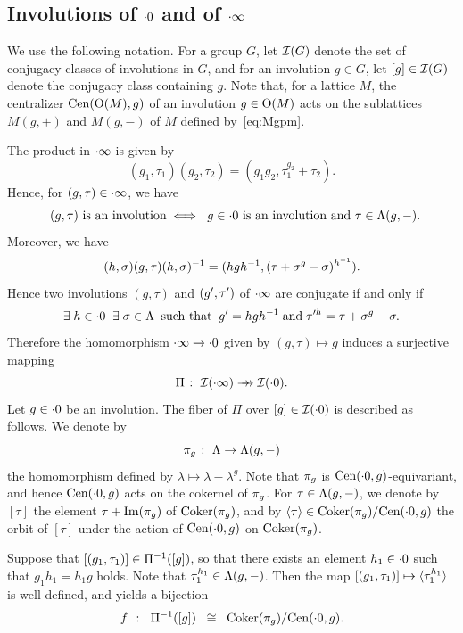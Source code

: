 \documentclass{amsart} %
\begin{document}
\subsection{Involutions of $\cdot 0$ and of $\cdot \infty$}\label{subsec:zinf}
%
We use the following notation.
For a group $G$, let $\mathord{\mathcal{I}}(G)$ denote the set of conjugacy classes of involutions in $G$, and 
for an involution $g\in G$, let $[g]\in \mathord{\mathcal{I}}(G)$ denote the conjugacy class containing $g$.
Note that, for a lattice $M$, 
 the centralizer $\mathrm{Cen}(\mathord{\mathrm{O}}(M), g)$ 
 of an involution $g\in \mathord{\mathrm{O}}(M)$
acts on 
the sublattices $M(g, +)$ and $M(g, -)$ of $M$ defined by~\eqref{eq:Mgpm}.
\par
The product in $\cdot \infty$ is given by 
\[
(g_1, \tau_1)(g_2, \tau_2)=(g_1g_2, \tau_1^{g_2}+\tau_2).
\]
Hence, for $(g, \tau)\in \cdot \infty$, we have 
%
\begin{equation}\label{eq:gtauisinvoliff}
\textrm{\;\;$(g, \tau)$ is an involution}
\;\Longleftrightarrow\;
\textrm{
$g\in \cdot 0$ is an involution and $\tau\in \Lambda(g, -)$}.
\end{equation}
%
Moreover, we have 
%
\begin{equation}\label{eq:hsgthsinv}
(h, \sigma)(g, \tau)(h, \sigma)^{-1}
=(hgh^{-1}, (\tau+\sigma^g-\sigma)^{h^{-1}}).
\end{equation}
%
Hence 
two involutions $(g, \tau)$ and $(g^{\prime}, \tau^{\prime})$ of $\cdot \infty$ are conjugate if and only if
%
\begin{equation}\label{eq:conjiff}
\exists\; h\in \cdot 0 \;\;
\exists\; \sigma\in \Lambda \;\;
\textrm{such that} \;\;
g^{\prime}=h g h^{-1}
\;\textrm{and}\; \tau\sp{\prime h}=\tau+\sigma^{g}-\sigma.
\end{equation}
%
Therefore the homomorphism $\cdot \infty \to \cdot 0$ given by $(g, \tau)\mapsto g$
induces a surjective mapping
\[
\Pi\;\colon\; \mathord{\mathcal{I}}(\cdot \infty)\mathrel{\rightarrow\!\!\!\!\rightarrow} \mathord{\mathcal{I}}(\cdot 0).
\]
Let $g\in \cdot 0$ be an involution.
The fiber of $\Pi$ over $[g]\in\mathord{\mathcal{I}}(\cdot 0)$ is described as follows.
We denote by 
\[
\pi_{g}\;\colon\; \Lambda \to \Lambda (g, -)
\]
the homomorphism defined by $\lambda\mapsto \lambda-\lambda^g$.
Note that $\pi_{g}$ is $\mathrm{Cen}(\cdot 0, g)$-equivariant,
and hence $\mathrm{Cen}(\cdot 0, g)$ acts on the cokernel of $\pi_{g}$.
For $\tau\in \Lambda (g, -)$, 
we denote by $[\tau]$ the element $\tau+\operatorname{Im}(\pi_{g})$ of $\operatorname{Coker}(\pi_{g})$,
and by $\langle {\tau} \rangle\in \operatorname{Coker}(\pi_{g})/\mathrm{Cen}(\cdot 0, g)$ the orbit of
$[\tau]$ under the action of $\mathrm{Cen}(\cdot 0, g)$ on $ \operatorname{Coker}(\pi_{g})$.
%
%
\begin{proposition}\label{prop:bijf}
Suppose that $[(g_1, \tau_1)]\in \Pi^{-1}([g])$,
so that there exists an element $h_1\in \cdot 0$
such that $g_1h_1=h_1 g $ holds.
Note that $\tau_1\sp{h_1}\in \Lambda(g, -)$.
Then the map
$[(g_1, \tau_1)] \mapsto \langle {\tau_1\sp{h_1}} \rangle$ 
is well defined, and 
yields a bijection 
%
\begin{equation}\label{eq:Piinvg}
f\;\;\colon\;\; \Pi^{-1}([g])\;\;\cong\;\; \operatorname{Coker}(\pi_{g})/\mathrm{Cen}(\cdot 0, g).
\end{equation}
%
\end{proposition}
\end{document}
